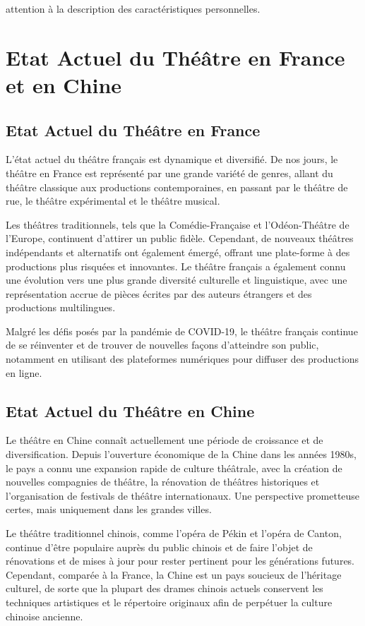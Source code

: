 \documentclass[UTF8,a4paper,12pt]{ctexart}
\numberwithin{equation}{section}
\newcommand{\mycite}[1]{\cite{#1}}
\begin{document}
attention à la description des caractéristiques personnelles.


\newpage
{}
 \label{sec:4}
\section{Etat Actuel du Théâtre en France et en Chine}

\subsection{Etat Actuel du Théâtre en France}
L'état actuel du théâtre français est dynamique et diversifié. De nos jours, le théâtre en France est représenté par une grande variété de genres, allant du théâtre classique aux productions contemporaines, en passant par le théâtre de rue, le théâtre expérimental et le théâtre musical.

Les théâtres traditionnels, tels que la Comédie-Française et l'Odéon-Théâtre de l'Europe, continuent d'attirer un public fidèle. Cependant, de nouveaux théâtres indépendants et alternatifs ont également émergé, offrant une plate-forme à des productions plus risquées et innovantes. Le théâtre français a également connu une évolution vers une plus grande diversité culturelle et linguistique, avec une représentation accrue de pièces écrites par des auteurs étrangers et des productions multilingues\mycite{sparks2014mise}.

Malgré les défis posés par la pandémie de COVID-19, le théâtre français continue de se réinventer et de trouver de nouvelles façons d'atteindre son public, notamment en utilisant des plateformes numériques pour diffuser des productions en ligne.

\subsection{Etat Actuel du Théâtre en Chine}
Le théâtre en Chine connaît actuellement une période de croissance et de diversification. Depuis l'ouverture économique de la Chine dans les années 1980s, le pays a connu une expansion rapide de culture théâtrale, avec la création de nouvelles compagnies de théâtre, la rénovation de théâtres historiques et l'organisation de festivals de théâtre internationaux. Une perspective prometteuse certes, mais uniquement dans les grandes villes. 

Le théâtre traditionnel chinois, comme l'opéra de Pékin et l'opéra de Canton, continue d'être populaire auprès du public chinois et de faire l'objet de rénovations et de mises à jour pour rester pertinent pour les générations futures. Cependant, comparée à la France, la Chine est un pays soucieux de l'héritage culturel, de sorte que la plupart des drames chinois actuels conservent les techniques artistiques et le répertoire originaux afin de perpétuer la culture chinoise ancienne\mycite{18}.
\end{document}
